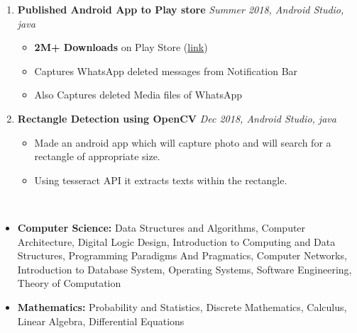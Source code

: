 \documentclass[a4paper,12pt]{awesome}
\newcommand{\lsep}{-0.5cm}
\begin{document}
\begin{enumerate}
\begin{itemize}
        \end{itemize}
    \item \textbf{Published Android App to Play store}
    \hfill  \emph{Summer 2018, Android Studio, java} \\[-0.6cm]
    \begin{itemize}
        \item \textbf{2M+ Downloads} on Play Store (\href{https://play.google.com/store/apps/details?id=com.extricks.whatsdeleted}{link})
        \item Captures WhatsApp deleted messages from Notification Bar
	    \item Also Captures deleted Media files of WhatsApp
    \end{itemize}
    \item \textbf{Rectangle Detection using OpenCV}
    \hfill  \emph{Dec 2018, Android Studio, java} \\[-0.6cm]
    \begin{itemize}
       \item Made an android app which will capture photo and will search for a rectangle of appropriate size. 
	    \item Using tesseract API it extracts texts within the rectangle.
    \end{itemize}
\end{enumerate}
\\[\lsep]
    \begin{itemize}
        \item \textbf{Computer Science: }Data Structures and Algorithms, Computer Architecture, Digital Logic Design, 
            Introduction to Computing and Data Structures, Programming Paradigms And Pragmatics,
            Computer Networks, Introduction to Database System, Operating Systems, Software Engineering,
            Theory of Computation
	    \item \textbf{Mathematics: }Probability and Statistics, Discrete Mathematics, Calculus, Linear Algebra, Differential Equations
    \end{itemize}
\\[\lsep]
\end{document}
